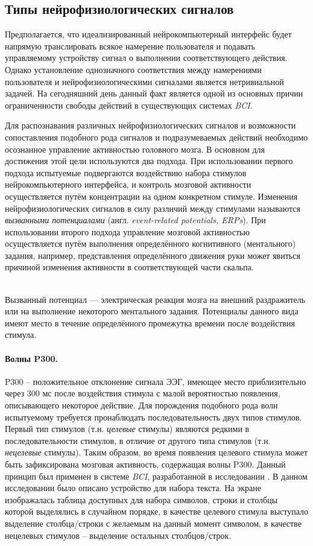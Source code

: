 \documentclass[12pt,a4paper,oneside,fleqn,leqno]{article}
\newcounter{pe} %
\newcommand*{\Nep}{\addtocounter{pe}{1}{\arabic{pe}$^{\circ}$.\;}}
\newcommand*{\NepS}{\mbox{} \\ \Nep}
\begin{document}
	\subsection{Типы нейрофизиологических сигналов}
	\par Предполагается, что идеализированный нейрокомпьютерный интерфейс будет напрямую транслировать всякое намерение пользователя и подавать управляемому устройству сигнал о выполнении соответствующего действия. Однако установление однозначного соответствия между намерениями пользователя и нейрофизиологическими сигналами является нетривиальной задачей. На сегодняшний день данный факт является одной из основных причин ограниченности свободы действий в существующих системах {\it BCI}.
	\par Для распознавания различных нейрофизиологических сигналов и возможности сопоставления подобного рода сигналов и подразумеваемых действий необходимо осознанное управление активностью головного мозга. В основном для достижения этой цели используются два подхода. При использовании первого подхода испытуемые подвергаются воздействию набора стимулов нейрокомпьютерного интерфейса, и контроль мозговой активности осуществляется путём концентрации на одном конкретном стимуле. Изменения нейрофизиологических сигналов в силу различий между стимулами называются {\it вызванными потенциалами} (англ. {\it event-related potentials, ERPs}). При использовании второго подхода управление мозговой активностью осуществляется путём выполнения определённого когнитивного (ментального) задания, например, представления определённого движения руки может явиться причиной изменения активности в соответствующей части скальпа.\\
	\setcounter{pe}{0}
	\NepS {\bf Вызванные потенциалы}
	\par Вызванный потенциал — электрическая реакция мозга на внешний раздражитель или на выполнение некоторого ментального задания. Потенциалы данного вида имеют место в течение определённого промежутка времени после воздействия стимула.
	\paragraph{Волны P300.}
	 P300 -- положительное отклонение сигнала ЭЭГ, имеющее место приблизительно через 300 мс после воздействия стимула с малой вероятностью появления, описывающего некоторое действие. Для порождения подобного рода волн испытуемому требуется пронаблюдать последовательность двух типов стимулов. Первый тип стимулов (т.н. {\it целевые} стимулы) являются редкими в последовательности стимулов, в отличие от другого типа стимулов (т.н. {\it нецелевые} стимулы). Таким образом, во время появления целевого стимула может быть зафиксирована мозговая активность, содержащая волны P300. Данный принцип был применен в системе {\it BCI}, разработанной в исследовании \cite{Farwell_Donchin}. В данном исследовании было описано устройство для набора текста. На экране изображалась таблица доступных для набора символов, строки и столбцы которой выделялись в случайном порядке, в качестве целевого стимула выступало выделение столбца/строки с желаемым на данный момент символом, в качестве нецелевых стимулов -- выделение остальных столбцов/строк.
\end{document}
